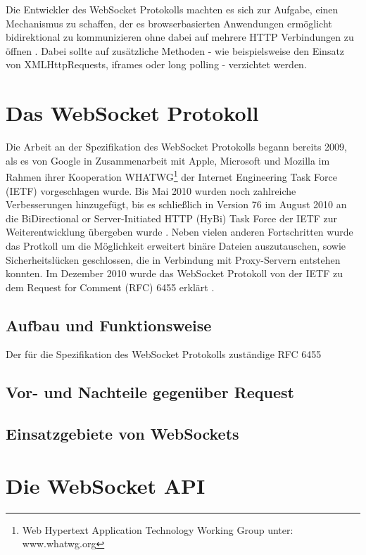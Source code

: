 \documentclass[11pt,a4paper,titlepage]{scrartcl}
\numberwithin{equation}{section}
\begin{document}
\noindent Die Entwickler des WebSocket Protokolls machten es sich zur Aufgabe, einen Mechanismus zu schaffen, der es browserbasierten Anwendungen ermöglicht bidirektional zu kommunizieren ohne dabei auf mehrere HTTP Verbindungen zu öffnen \autocite{fette_websocket_2011}. Dabei sollte auf zusätzliche Methoden - wie beispielsweise den Einsatz von XMLHttpRequests, iframes oder long polling - verzichtet werden.

\newpage
\section{Das WebSocket Protokoll}\label{sec:WebSocketProtokoll}
Die Arbeit an der Spezifikation des WebSocket Protokolls begann bereits 2009, als es von Google in Zusammenarbeit mit Apple, Microsoft und Mozilla im Rahmen ihrer Kooperation WHATWG\footnote{Web Hypertext Application Technology Working Group unter: www.whatwg.org} der Internet Engineering Task Force (IETF) vorgeschlagen wurde. Bis Mai 2010 wurden noch zahlreiche Verbesserungen hinzugefügt, bis es schließlich in Version 76 \autocite{hickson_websocket_2010} im August 2010 an die BiDirectional or Server-Initiated HTTP (HyBi) Task Force der IETF zur Weiterentwicklung übergeben wurde \autocite{fette_websocket_2010}. Neben vielen anderen Fortschritten wurde das Protkoll um die Möglichkeit erweitert binäre Dateien auszutauschen, sowie Sicherheitslücken geschlossen, die in Verbindung mit Proxy-Servern entstehen konnten. Im Dezember 2010 wurde das WebSocket Protokoll von der IETF zu dem Request for Comment (RFC) 6455 erklärt \autocite{fette_websocket_2011}.
\subsection{Aufbau und Funktionsweise}\label{subsec:wsAufbau}
Der für die Spezifikation des WebSocket Protokolls zuständige RFC 6455 

\subsection{Vor- und Nachteile gegenüber Request}
\subsection{Einsatzgebiete von WebSockets}

\section{Die WebSocket API}\label{sec:WebSocketAPI}
\end{document}
